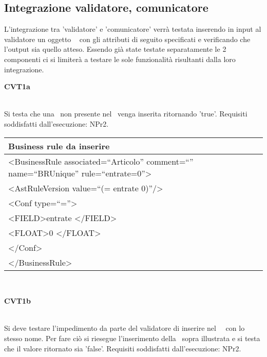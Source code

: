 \subsection{Integrazione validatore, comunicatore}
L'integrazione tra 'validatore' e 'comunicatore' verr\`a testata inserendo in input al validatore un oggetto \textit{\br\ } con gli attributi di seguito specificati e verificando che l'output sia quello atteso. Essendo gi\`a state testate separatamente le 2 componenti ci si limiter\`a a testare le sole funzionalit\`a risultanti dalla loro integrazione.\\

\begin{Large}\textbf{CVT1a}\end{Large} \\
Si testa che una \br\ non presente nel \rp\ venga inserita ritornando 'true'.
Requisiti soddisfatti dall'esecuzione: NPr2. \\
\begin{center}
\begin{tabular}{|p{11cm}|} \hline
\textbf{Business rule da inserire}\\ \hline
\textless BusinessRule associated=``Articolo'' comment=``'' name=``BRUnique'' rule=``entrate=0''\textgreater \\
\textless AstRuleVersion value=``(= entrate 0)''/\textgreater \\
 \textless Conf type=``=''\textgreater \\
 \textless FIELD\textgreater entrate \textless /FIELD\textgreater \\
 \textless FLOAT\textgreater 0 \textless /FLOAT\textgreater \\
 \textless /Conf\textgreater \\
\textless /BusinessRule\textgreater \\ \hline
\end{tabular} \\
\end{center}

\begin{Large}\textbf{CVT1b}\end{Large} \\
Si deve testare l'impedimento da parte del validatore di inserire nel \rp\ \br\ con lo stesso nome. Per fare ci\`o si riesegue l'inserimento della \br\ sopra illustrata e si testa che il valore ritornato sia 'false'.
Requisiti soddisfatti dall'esecuzione: NPr2.\\
 \\
